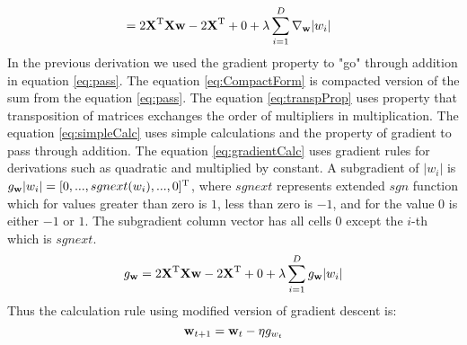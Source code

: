\documentclass[10pt,a4paper]{article}
\begin{document}
\begin{enumerate}
\begin{enumerate}
\begin{align}
	&= 2\textbf{\text{{X}}} ^ \text{T}\textbf{\text{{X}}}\textbf{\text{{w}}} - 2\textbf{\text{{X}}} ^ \text{T} + 0 + \lambda \sum_{i=1}^D \nabla_{\textbf{\text{{w}}}} |w_i| \label{eq:gradientCalc}
\end{align}
In the previous derivation we used the gradient property to "go" through addition in equation \ref{eq:pass}. The equation \ref{eq:CompactForm} is compacted version of the sum from the equation \ref{eq:pass}. The equation \ref{eq:transpProp} uses property that transposition of matrices exchanges the order of multipliers in multiplication. The equation \ref{eq:simpleCalc} uses simple calculations and the property of gradient to pass through addition. The equation \ref{eq:gradientCalc} uses gradient rules for derivations such as quadratic and multiplied by constant.
A subgradient of $|w_i|$ is $g_{\textbf{\text{{w}}}}|w_i| = [0, ..., sgnext(w_i), ..., 0]^\text{T}$, where $sgnext$ represents extended $sgn$ function which for values greater than zero is $1$, less than zero is $-1$, and for the value 0 is either $-1$ or $1$. The subgradient column vector has all cells 0 except the $i$-th which is $sgnext$.
$$g_{\textbf{\text{{w}}}} = 2\textbf{\text{{X}}} ^ \text{T}\textbf{\text{{X}}}\textbf{\text{{w}}} - 2\textbf{\text{{X}}} ^ \text{T} + 0 + \lambda \sum_{i=1}^D g_{\textbf{\text{{w}}}}|w_i| $$
Thus the calculation rule using modified version of gradient descent is:
$$\textbf{\text{{w}}}_{t+1}=\textbf{\text{{w}}}_t - \eta g_{w_t}$$
 
  \end{enumerate}
\end{enumerate}
\end{document}
